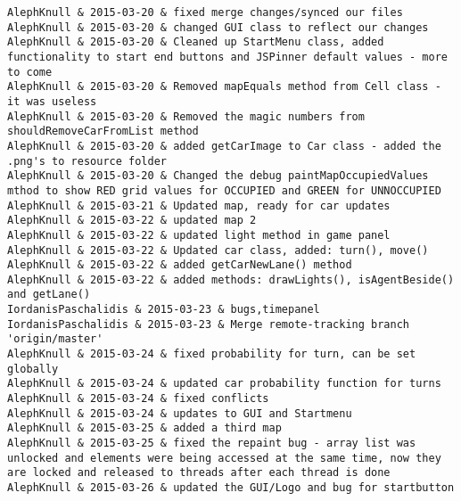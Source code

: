\begin{lstlisting}
AlephKnull & 2015-03-20 & fixed merge changes/synced our files
AlephKnull & 2015-03-20 & changed GUI class to reflect our changes
AlephKnull & 2015-03-20 & Cleaned up StartMenu class, added functionality to start end buttons and JSPinner default values - more to come
AlephKnull & 2015-03-20 & Removed mapEquals method from Cell class - it was useless
AlephKnull & 2015-03-20 & Removed the magic numbers from shouldRemoveCarFromList method
AlephKnull & 2015-03-20 & added getCarImage to Car class - added the .png's to resource folder
AlephKnull & 2015-03-20 & Changed the debug paintMapOccupiedValues mthod to show RED grid values for OCCUPIED and GREEN for UNNOCCUPIED
AlephKnull & 2015-03-21 & Updated map, ready for car updates
AlephKnull & 2015-03-22 & updated map 2
AlephKnull & 2015-03-22 & updated light method in game panel
AlephKnull & 2015-03-22 & Updated car class, added: turn(), move()
AlephKnull & 2015-03-22 & added getCarNewLane() method
AlephKnull & 2015-03-22 & added methods: drawLights(), isAgentBeside() and getLane()
IordanisPaschalidis & 2015-03-23 & bugs,timepanel
IordanisPaschalidis & 2015-03-23 & Merge remote-tracking branch 'origin/master'
AlephKnull & 2015-03-24 & fixed probability for turn, can be set globally
AlephKnull & 2015-03-24 & updated car probability function for turns
AlephKnull & 2015-03-24 & fixed conflicts
AlephKnull & 2015-03-24 & updates to GUI and Startmenu
AlephKnull & 2015-03-25 & added a third map
AlephKnull & 2015-03-25 & fixed the repaint bug - array list was unlocked and elements were being accessed at the same time, now they are locked and released to threads after each thread is done
AlephKnull & 2015-03-26 & updated the GUI/Logo and bug for startbutton
\end{lstlisting}
